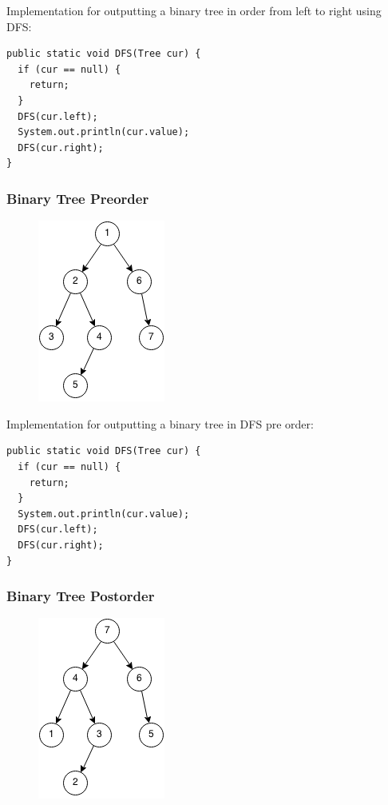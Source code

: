 \documentclass[11pt,oneside]{book}
\makeatletter
\def\maxwidth#1{\ifdim\Gin@nat@width>#1 #1\else\Gin@nat@width\fi}
\makeatother
\begin{document}
Implementation for outputting a binary tree in order from left to right using DFS:

\begin{lstlisting}
public static void DFS(Tree cur) {
  if (cur == null) {
    return;
  }
  DFS(cur.left);
  System.out.println(cur.value);
  DFS(cur.right);
}
\end{lstlisting}

\subsubsection{Binary Tree Preorder}

\vspace{5px}\begin{figure}[H]\centering
        \includegraphics[width=0.66\maxwidth{\textwidth}]{dfs-preorder.png}
        \end{figure}

Implementation for outputting a binary tree in DFS pre order:

\begin{lstlisting}
public static void DFS(Tree cur) {
  if (cur == null) {
    return;
  }
  System.out.println(cur.value);
  DFS(cur.left);
  DFS(cur.right);
}
\end{lstlisting}

\subsubsection{Binary Tree Postorder}

\vspace{5px}\begin{figure}[H]\centering
        \includegraphics[width=0.66\maxwidth{\textwidth}]{dfs-postorder.png}
        \end{figure}
\end{document}
